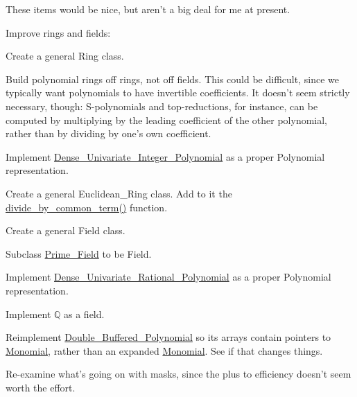 \begin{DoxyRefList}
These items would be nice, but aren't a big deal for me at present.
\begin{DoxyItemize}
\item Improve rings and fields\+:
\begin{DoxyItemize}
\item Create a general {\ttfamily Ring} class.
\begin{DoxyItemize}
\item Build polynomial rings off rings, not off fields. This could be difficult, since we typically want polynomials to have invertible coefficients. It doesn't seem strictly necessary, though\+: S-\/polynomials and top-\/reductions, for instance, can be computed by multiplying by the leading coefficient of the other polynomial, rather than by dividing by one's own coefficient.
\item Implement \hyperlink{group__polygroup_class_dense___univariate___integer___polynomial}{Dense\+\_\+\+Univariate\+\_\+\+Integer\+\_\+\+Polynomial} as a proper {\ttfamily Polynomial} representation.
\item Create a general {\ttfamily Euclidean\+\_\+\+Ring} class. Add to it the \hyperlink{group__utils_gaefe33f79de88accbc6f455e91dab9288}{divide\+\_\+by\+\_\+common\+\_\+term()} function.
\end{DoxyItemize}
\item Create a general {\ttfamily Field} class.
\begin{DoxyItemize}
\item Subclass \hyperlink{group___fields_group_class_prime___field}{Prime\+\_\+\+Field} to be {\ttfamily Field}.
\item Implement \hyperlink{group__polygroup_class_dense___univariate___rational___polynomial}{Dense\+\_\+\+Univariate\+\_\+\+Rational\+\_\+\+Polynomial} as a proper {\ttfamily Polynomial} representation.
\item Implement $\mathbb Q$ as a field.
\end{DoxyItemize}
\end{DoxyItemize}
\item Reimplement \hyperlink{group__polygroup_class_double___buffered___polynomial}{Double\+\_\+\+Buffered\+\_\+\+Polynomial} so its arrays contain pointers to \hyperlink{group__polygroup_class_monomial}{Monomial}, rather than an expanded \hyperlink{group__polygroup_class_monomial}{Monomial}. See if that changes things.
\item Re-\/examine what's going on with masks, since the plus to efficiency doesn't seem worth the effort.

\end{DoxyItemize}
\end{DoxyRefList}
